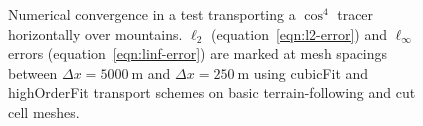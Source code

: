 \begin{figure}
	\centering
	
	\caption{Numerical convergence in a test transporting a $\cos^4$ tracer horizontally over mountains.
	$\ell_2$ (equation~\ref{eqn:l2-error}) and $\ell_\infty$ errors (equation~\ref{eqn:linf-error}) are marked at mesh spacings between $\Delta x = \SI{5000}{\meter}$ and $\Delta x = \SI{250}{\meter}$ using cubicFit and highOrderFit transport schemes on basic terrain-following and cut cell meshes.}
	\label{fig:highOrderFit:schaerAdvectSmooth:convergence}
\end{figure}
